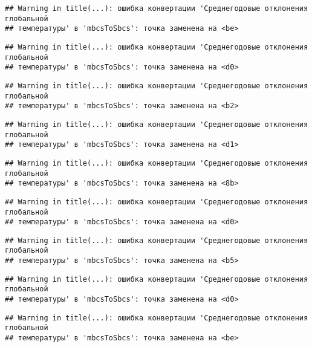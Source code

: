 \documentclass[
]{article}
\begin{document}
\begin{verbatim}
## Warning in title(...): ошибка конвертации 'Среднегодовые отклонения глобальной
## температуры' в 'mbcsToSbcs': точка заменена на <be>
\end{verbatim}

\begin{verbatim}
## Warning in title(...): ошибка конвертации 'Среднегодовые отклонения глобальной
## температуры' в 'mbcsToSbcs': точка заменена на <d0>
\end{verbatim}

\begin{verbatim}
## Warning in title(...): ошибка конвертации 'Среднегодовые отклонения глобальной
## температуры' в 'mbcsToSbcs': точка заменена на <b2>
\end{verbatim}

\begin{verbatim}
## Warning in title(...): ошибка конвертации 'Среднегодовые отклонения глобальной
## температуры' в 'mbcsToSbcs': точка заменена на <d1>
\end{verbatim}

\begin{verbatim}
## Warning in title(...): ошибка конвертации 'Среднегодовые отклонения глобальной
## температуры' в 'mbcsToSbcs': точка заменена на <8b>
\end{verbatim}

\begin{verbatim}
## Warning in title(...): ошибка конвертации 'Среднегодовые отклонения глобальной
## температуры' в 'mbcsToSbcs': точка заменена на <d0>
\end{verbatim}

\begin{verbatim}
## Warning in title(...): ошибка конвертации 'Среднегодовые отклонения глобальной
## температуры' в 'mbcsToSbcs': точка заменена на <b5>
\end{verbatim}

\begin{verbatim}
## Warning in title(...): ошибка конвертации 'Среднегодовые отклонения глобальной
## температуры' в 'mbcsToSbcs': точка заменена на <d0>
\end{verbatim}

\begin{verbatim}
## Warning in title(...): ошибка конвертации 'Среднегодовые отклонения глобальной
## температуры' в 'mbcsToSbcs': точка заменена на <be>
\end{verbatim}
\end{document}
